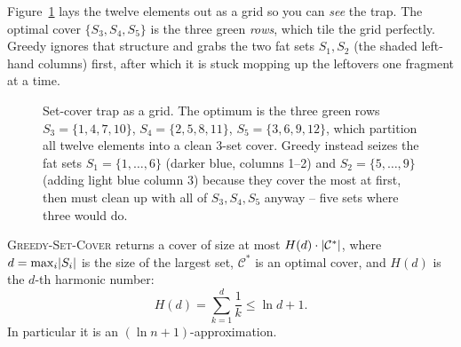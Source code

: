 Figure~\ref{ch34:sc-grid} lays the twelve elements out as a grid so you can
\emph{see} the trap. The optimal cover $\{S_3,S_4,S_5\}$ is the three green
\emph{rows}, which tile the grid perfectly. Greedy ignores that structure and
grabs the two fat sets $S_1,S_2$ (the shaded left-hand columns) first, after
which it is stuck mopping up the leftovers one fragment at a time.

\begin{figure}[h]
\centering
{}
\caption{Set-cover trap as a grid. The optimum is the three green rows
$S_3=\{1,4,7,10\}$, $S_4=\{2,5,8,11\}$, $S_5=\{3,6,9,12\}$, which partition all
twelve elements into a clean $3$-set cover. Greedy instead seizes the fat sets
$S_1=\{1,\dots,6\}$ (darker blue, columns 1--2) and $S_2=\{5,\dots,9\}$
(adding light blue column 3) because they cover the most at first, then must clean up
with all of $S_3,S_4,S_5$ anyway -- five sets where three would do.}
\label{ch34:sc-grid}
\end{figure}

\begin{theorem}
\label{ch34:sc-thm}
\textsc{Greedy-Set-Cover} returns a cover of size at most
$H(d)\cdot\lvert\mathcal{C}^{*}\rvert$, where $d=\max_i \lvert S_i\rvert$ is the size of the
largest set, $\mathcal{C}^{*}$ is an optimal cover, and
$H(d)$ is the $d$-th harmonic number:
\[
H(d) = \sum_{k=1}^{d} \frac{1}{k} \le \ln d + 1 .
\]
In
particular it is an $(\ln n + 1)$-approximation.
\end{theorem}

